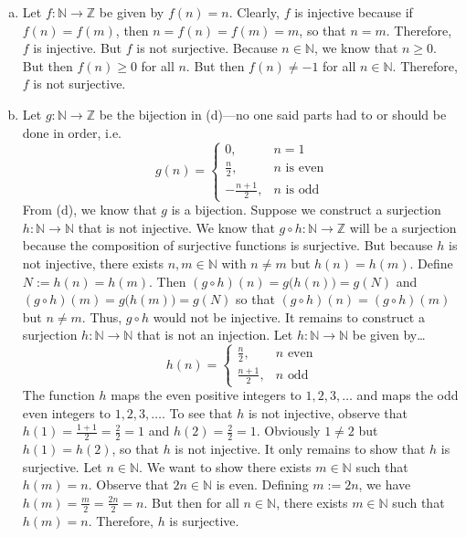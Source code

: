 \documentclass[11pt,letterpaper]{article}
\begin{document}
\begin{enumerate}[(a)]
\item Let $f: \mathbb{N} \to \mathbb{Z}$ be given by $f(n)= n$. Clearly, $f$ is injective because if $f(n)= f(m)$, then $n= f(n)= f(m)= m$, so that $n= m$. Therefore, $f$ is injective. But $f$ is not surjective. Because $n \in \mathbb{N}$, we know that $n \geq 0$. But then $f(n) \geq 0$ for all $n$. But then $f(n) \neq -1$ for all $n \in \mathbb{N}$. Therefore, $f$ is not surjective. \pspace

\item Let $g: \mathbb{N} \to \mathbb{Z}$ be the bijection in (d)---no one said parts had to or should be done in order, i.e.
	\[
	g(n)= 
	\begin{cases}
	0, & n= 1 \\
	\frac{n}{2}, & n \text{ is even} \\
	-\frac{n + 1}{2}, & n \text{ is odd}
	\end{cases}
	\]
From (d), we know that $g$ is a bijection. Suppose we construct a surjection $h: \mathbb{N} \to \mathbb{N}$ that is not injective. We know that $g \circ h: \mathbb{N} \to \mathbb{Z}$ will be a surjection because the composition of surjective functions is surjective. But because $h$ is not injective, there exists $n, m \in \mathbb{N}$ with $n \neq m$ but $h(n)= h(m)$. Define $N:= h(n)= h(m)$. Then $(g \circ h)(n)= g \big (h (n) \big)= g(N)$ and $(g \circ h)(m)= g \big( h(m) \big)= g(N)$ so that $(g \circ h)(n)= (g \circ h)(m)$ but $n \neq m$. Thus, $g \circ h$ would not be injective. It remains to construct a surjection $h: \mathbb{N} \to \mathbb{N}$ that is not an injection. Let $h: \mathbb{N} \to \mathbb{N}$ be given by\dots
	\[
	h(n)=
	\begin{cases}
	\frac{n}{2}, & n \text{ even} \\
	\frac{n + 1}{2}, & n \text{ odd}
	\end{cases}
	\]
The function $h$ maps the even positive integers to $1, 2, 3, \ldots$ and maps the odd even integers to $1, 2, 3, \ldots$. To see that $h$ is not injective, observe that $h(1)= \frac{1 + 1}{2}= \frac{2}{2}= 1$ and $h(2)= \frac{2}{2}= 1$. Obviously $1 \neq 2$ but $h(1)= h(2)$, so that $h$ is not injective. It only remains to show that $h$ is surjective. Let $n \in \mathbb{N}$. We want to show there exists $m \in \mathbb{N}$ such that $h(m)= n$. Observe that $2n \in \mathbb{N}$ is even. Defining $m:= 2n$, we have $h(m)= \frac{m}{2}= \frac{2n}{2}= n$. But then for all $n \in \mathbb{N}$, there exists $m \in \mathbb{N}$ such that $h(m)= n$. Therefore, $h$ is surjective. \pspace


\end{enumerate}
\end{document}
